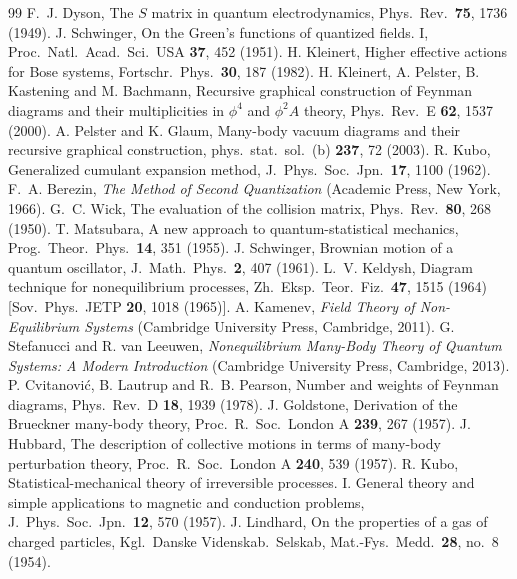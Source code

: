 \documentclass[11pt,a4paper]{article}
\begin{document}
\begin{thebibliography}{99}
 F.~J. Dyson, The $S$ matrix in quantum electrodynamics, Phys.\ Rev.\ \textbf{75}, 1736 (1949).
 J. Schwinger, On the Green's functions of quantized fields. I, Proc.\ Natl.\ Acad.\ Sci.\ USA \textbf{37}, 452 (1951).
 H. Kleinert, Higher effective actions for Bose systems, Fortschr.\ Phys.\ \textbf{30}, 187
  (1982).
 H. Kleinert, A. Pelster, B. Kastening and M. Bachmann, Recursive
  graphical construction of Feynman diagrams and their multiplicities in $\phi^4$ and $\phi^2A$ theory, Phys.\ Rev.\ E
  \textbf{62}, 1537 (2000).
 A. Pelster and K. Glaum, Many-body vacuum diagrams and their recursive graphical
  construction, phys.\ stat.\ sol.\ (b) \textbf{237}, 72 (2003).
 R. Kubo, Generalized cumulant expansion method, J.\ Phys.\ Soc.\ Jpn.\ \textbf{17}, 1100 (1962).
 F.~A. Berezin, \emph{The Method of Second Quantization} (Academic Press, New York, 1966).
 G.~C. Wick, The evaluation of the collision matrix, Phys.\ Rev.\ \textbf{80}, 268 (1950).
 T. Matsubara, A new approach to quantum-statistical mechanics, Prog.\ Theor.\ Phys.\ \textbf{14}, 351 (1955).
 J. Schwinger, Brownian motion of a quantum oscillator, J.\ Math.\ Phys.\ \textbf{2}, 407 (1961).
 L.~V. Keldysh, Diagram technique for nonequilibrium processes, Zh.\ Eksp.\ Teor.\ Fiz.\ \textbf{47}, 1515 (1964) [Sov.\ Phys.\ JETP \textbf{20}, 1018 (1965)].
 A. Kamenev, \emph{Field Theory of Non-Equilibrium Systems} (Cambridge University Press, Cambridge, 2011).
 G. Stefanucci and R. van Leeuwen, \emph{Nonequilibrium Many-Body Theory of Quantum Systems: A Modern Introduction} (Cambridge University Press, Cambridge, 2013).
 P. Cvitanovi\'c, B. Lautrup and R.~B. Pearson, Number and weights of Feynman diagrams, Phys.\ Rev.\ D \textbf{18}, 1939 (1978).
 J. Goldstone, Derivation of the Brueckner many-body theory, Proc.\ R.\ Soc.\ London A \textbf{239}, 267 (1957).
 J. Hubbard, The description of collective motions in terms of many-body perturbation theory, Proc.\ R.\ Soc.\ London A \textbf{240}, 539 (1957).
 R. Kubo, Statistical-mechanical theory of irreversible processes. I. General theory and simple applications to magnetic and conduction problems, J.\ Phys.\ Soc.\ Jpn.\ \textbf{12}, 570 (1957).
 J. Lindhard, On the properties of a gas of charged particles, Kgl.\ Danske Videnskab.\ Selskab, Mat.-Fys.\ Medd.\ \textbf{28}, no.~8 (1954).

\end{thebibliography}
\end{document}
